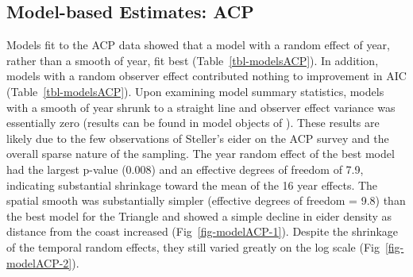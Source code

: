 \documentclass[
  10pt,
  letterpaper,
]{article}
\begin{document}
\subsection{Model-based Estimates: ACP}\label{model-based-estimates-acp}

Models fit to the ACP data showed that a model with a random effect of
year, rather than a smooth of year, fit best
(Table~\ref{tbl-modelsACP}). In addition, models with a random observer
effect contributed nothing to improvement in AIC
(Table~\ref{tbl-modelsACP}). Upon examining model summary statistics,
models with a smooth of year shrunk to a straight line and observer
effect variance was essentially zero (results can be found in model
objects of ). These results are likely due to the
few observations of Steller's eider on the ACP survey and the overall
sparse nature of the sampling. The year random effect of the best model
had the largest p-value (0.008) and an effective degrees of freedom of
7.9, indicating substantial shrinkage toward the mean of the 16 year
effects. The spatial smooth was substantially simpler (effective degrees
of freedom = 9.8) than the best model for the Triangle and showed a
simple decline in eider density as distance from the coast increased
(Fig~\ref{fig-modelACP-1}). Despite the shrinkage of the temporal random
effects, they still varied greatly on the log scale
(Fig~\ref{fig-modelACP-2}).
\end{document}

